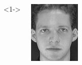 
\begin{frame}
\end{frame}

\begin{frame}
  \begin{columns}
    <1->
    \begin{overlayarea}{\textwidth}{\textheight}
      \begin{minipage}[t]{0.15\textwidth}
        \includegraphics[width=\textwidth]{images/celebrity_images/s1_1.jpg}
      \end{minipage}
      \begin{minipage}[t]{0.15\textwidth}

\end{minipage}
\end{overlayarea}
\end{columns}
\end{frame}
